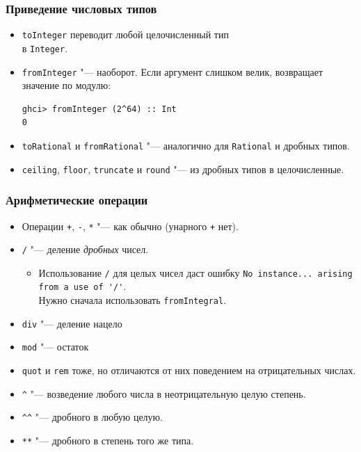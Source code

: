 \documentclass[10pt]{beamer}
\begin{document}
\begin{frame}[fragile]
  \frametitle{Приведение числовых типов}
  \begin{itemize}
    \item \lstinline|toInteger| переводит любой целочисленный тип \\в \lstinline|Integer|.
    \item \lstinline|fromInteger| "--- наоборот. Если аргумент слишком велик, возвращает значение по модулю:
          \begin{lstlisting}
ghci> fromInteger (2^64) :: Int
0
\end{lstlisting}
    \item \lstinline|toRational| и \lstinline|fromRational| "--- аналогично для \lstinline|Rational| и дробных типов.
    \item \lstinline|ceiling|, \lstinline|floor|, \lstinline|truncate| и \lstinline|round| "--- из дробных типов в целочисленные.
  \end{itemize}
\end{frame}

\begin{frame}[fragile]
  \frametitle{Арифметические операции}
  \begin{itemize}
    \item Операции \lstinline|+|, \lstinline|-|, \lstinline|*| "--- как обычно (унарного \lstinline|+| нет).
    \item \lstinline|/| "--- деление \emph{дробных} чисел.
          \begin{itemize}
            \item Использование \lstinline|/| для целых чисел даст ошибку \lstinline|No instance... arising from a use of '/'|. \\Нужно сначала использовать \lstinline|fromIntegral|.
          \end{itemize}
    \item \lstinline|div| "--- деление нацело
    \item \lstinline|mod| "--- остаток
    \item
          \lstinline|quot| и \lstinline|rem| тоже, но отличаются от них поведением на отрицательных числах.
    \item \lstinline|^| "--- возведение любого числа в неотрицательную  целую степень.
    \item \lstinline|^^| "--- дробного в любую целую.
    \item \lstinline|**| "--- дробного в степень того же типа.
  \end{itemize}
\end{frame}
\end{document}
